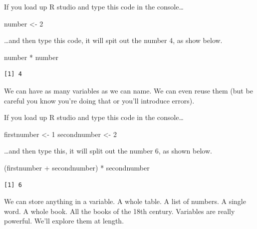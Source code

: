 \documentclass[
  letterpaper,
  DIV=11,
  numbers=noendperiod]{scrreprt}
\newenvironment{Shaded}{\begin{snugshade}}{\end{snugshade}}
\newcommand{\DecValTok}[1]{\textcolor[rgb]{0.68,0.00,0.00}{#1}}
\newcommand{\NormalTok}[1]{\textcolor[rgb]{0.00,0.23,0.31}{#1}}
\newcommand{\OtherTok}[1]{\textcolor[rgb]{0.00,0.23,0.31}{#1}}
\newcommand{\SpecialCharTok}[1]{\textcolor[rgb]{0.37,0.37,0.37}{#1}}
\begin{document}
If you load up R studio and type this code in the console\ldots{}

\begin{Shaded}
\begin{Highlighting}[]
\NormalTok{number }\OtherTok{\textless{}{-}} \DecValTok{2}
\end{Highlighting}
\end{Shaded}

\ldots and then type this code, it will spit out the number 4, as show
below.

\begin{Shaded}
\begin{Highlighting}[]
\NormalTok{number }\SpecialCharTok{*}\NormalTok{ number}
\end{Highlighting}
\end{Shaded}

\begin{verbatim}
[1] 4
\end{verbatim}

We can have as many variables as we can name. We can even reuse them
(but be careful you know you're doing that or you'll introduce errors).

If you load up R studio and type this code in the console\ldots{}

\begin{Shaded}
\begin{Highlighting}[]
\NormalTok{firstnumber }\OtherTok{\textless{}{-}} \DecValTok{1}
\NormalTok{secondnumber }\OtherTok{\textless{}{-}} \DecValTok{2} 
\end{Highlighting}
\end{Shaded}

\ldots and then type this, it will split out the number 6, as shown
below.

\begin{Shaded}
\begin{Highlighting}[]
\NormalTok{(firstnumber }\SpecialCharTok{+}\NormalTok{ secondnumber) }\SpecialCharTok{*}\NormalTok{ secondnumber}
\end{Highlighting}
\end{Shaded}

\begin{verbatim}
[1] 6
\end{verbatim}

We can store anything in a variable. A whole table. A list of numbers. A
single word. A whole book. All the books of the 18th century. Variables
are really powerful. We'll explore them at length.
\end{document}
